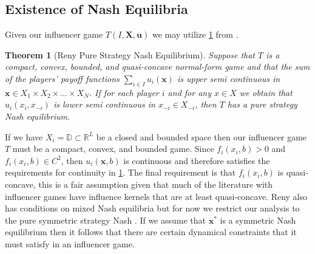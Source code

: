\documentclass{article}
\newtheorem{theorem}{Theorem}[section]
\newcommand {\R}{\mathbb{R}}
\begin{document}
        \subsection{Existence of Nash Equilibria}
            Given our influencer game $T(I,\mathbf{X},\mathbf{u})$ we may utilize \cref{thm:SI_Reny} from  \cite{reny2020nash,reny2016nash}. 
            \begin{theorem}[Reny Pure Strategy Nash Equilibrium]\label{thm:SI_Reny}
                Suppose that $T$ is a compact, convex, bounded, and quasi-concave normal-form game and that the sum of the players’ payoff functions $\sum_{i\in I} u_i(\mathbf{x})$ is upper semi continuous in $\mathbf{x}\in X_1\times X_2\times \dots \times X_N$. If for each player $i$ and for any $x \in X$ we obtain that $u_i (x_i,x_{-i})$ is lower semi continuous in $x_{-i} \in X_{-i}$, then $T$ has a pure strategy Nash equilibrium.
            \end{theorem}
            If we have $X_i=\mathbb{D}\subset \R^L$ be a closed and bounded space then our influencer game $T$ must be a compact, convex, and bounded game. Since $f_i(x_i,b)>0$ and $f_i(x_i,b)\in C^{2}$, then $u_i(\mathbf{x},b)$ is continuous and therefore satisfies the requirements for continuity in \cref{thm:SI_Reny}. The final requirement is that $f_i(x_i,b)$ is quasi-concave, this is a fair assumption given that much of the literature with influencer games have influence kernels that are at least quasi-concave. Reny also has conditions on mixed Nash equilibria but for now we restrict our analysis to the pure symmetric strategy Nash \cite{reny2020nash,reny2016nash}. If we assume that $\mathbf{x}^*$ is a symmetric Nash equilibrium then it follows that there are certain dynamical constraints that it must satisfy in an influencer game.  
\end{document}
